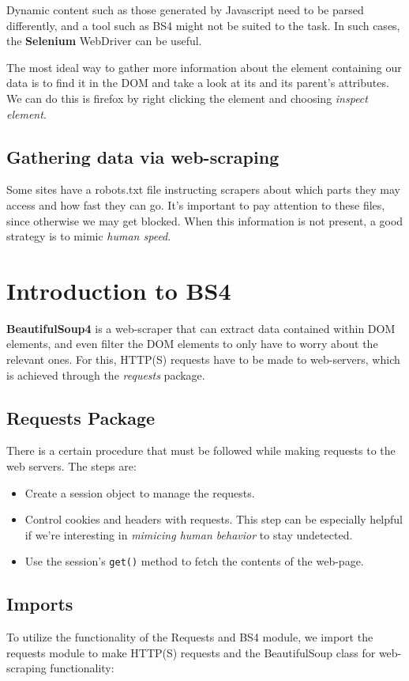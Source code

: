 Dynamic content such as those generated by Javascript need to be parsed differently, and a tool such as BS4 might not be suited to the task. In such cases, the \textbf{Selenium} WebDriver can be useful. 

The most ideal way to gather more information about the element containing our data is to find it in the DOM and take a look at its and its parent's attributes. We can do this is firefox by right clicking the element and choosing \textit{inspect element}. 

\subsection{Gathering data via web-scraping}
Some sites have a robots.txt file instructing scrapers about which parts they may access and how fast they can go. It's important to pay attention to these files, since otherwise we may get blocked. When this information is not present, a good strategy is to mimic \textit{human speed}. 

\section{Introduction to BS4}
\textbf{BeautifulSoup4} is a web-scraper that can extract data contained within DOM elements, and even filter the DOM elements to only have to worry about the relevant ones. For this, HTTP(S) requests have to be made to web-servers, which is achieved through the \textit{requests} package. 

\subsection{Requests Package}
There is a certain procedure that must be followed while making requests to the web servers. The steps are:

\begin{itemize}
	\item Create a session object to manage the requests.
	\item Control cookies and headers with requests. This step can be especially helpful if we're interesting in \textit{mimicing human behavior} to stay undetected. 
	\item Use the session's \verb|get()| method to fetch the contents of the web-page. 
\end{itemize}

\subsection{Imports}
To utilize the functionality of the Requests and BS4 module, we import the requests module to make HTTP(S) requests and the BeautifulSoup class for web-scraping functionality:

